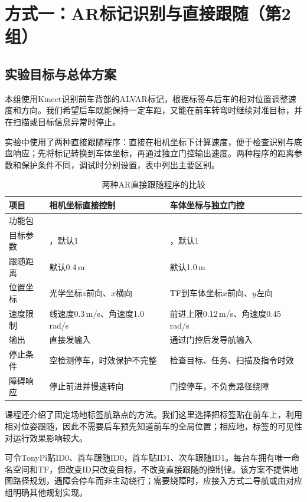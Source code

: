 \section{方式一：AR标记识别与直接跟随（第2组）}
\subsection{实验目标与总体方案}
本组使用Kinect识别前车背部的ALVAR标记，根据标签与后车的相对位置调整速度和方向。我们希望后车既能保持一定车距，又能在前车转弯时继续对准目标，并在扫描或目标信息异常时停止。\cite{follow1}

实验中使用了两种直接跟随程序：直接在相机坐标下计算速度，便于检查识别与底盘响应；先将标记转换到车体坐标，再通过独立门控输出速度。两种程序的距离参数和保护条件不同，调试时分别设置，表中列出主要区别。

\begin{table}[htbp]\centering\small
\caption{两种AR直接跟随程序的比较}
\begin{tabularx}{\linewidth}{p{31mm}YY}\toprule
项目 & 相机坐标直接控制 & 车体坐标与独立门控\\\midrule
功能包 &  & \\
目标参数 & ，默认1 & ，默认1\\
跟随距离 & 默认0.4\,m & 默认1.0\,m\\
位置坐标 & 光学坐标$z$前向、$x$横向 & TF到车体坐标$x$前向、$y$左向\\
速度限制 & 线速度0.3\,m/s、角速度1.0\,rad/s & 前进上限0.12\,m/s、角速度0.45\,rad/s\\
输出 & 直接发输入 & 通过门控后发导航输入\\
停止条件 & 空检测停车，时效保护不完整 & 检查目标、任务、扫描及指令时效\\
障碍响应 & 停止前进并慢速转向 & 门控停车，不负责路径绕障\\\bottomrule
\end{tabularx}\end{table}

课程还介绍了固定场地标签航路点的方法。我们这里选择把标签贴在前车上，利用相对位姿跟随，因此不需要后车预先知道前车的全局位置；相应地，标签的可见性对运行效果影响较大。


可令TonyPi贴ID0、首车跟随ID0，首车贴ID1、次车跟随ID1。每台车拥有唯一命名空间和TF，但改变ID只改变目标，不改变直接跟随的控制律。该方案不提供地图路径规划，遇障会停车而非主动绕行；需要绕障时，应接入方式二导航或由对应组明确其他规划实现。

